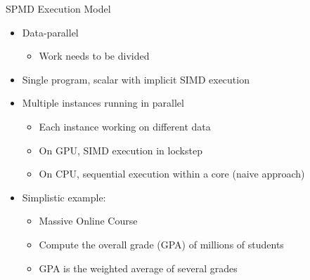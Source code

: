 
\begin{frame}{SPMD Execution Model}

\begin{itemize}
    \item Data-parallel
    \begin{itemize}
        \item Work needs to be divided
    \end{itemize}
    
    \item Single program, scalar with implicit SIMD execution
    
    \item Multiple instances running in parallel
    \begin{itemize}
        \item Each instance working on different data
        \item On GPU, SIMD execution in lockstep
        \item On CPU, sequential execution within a core (naive approach)
    \end{itemize}
\end{itemize}

\begin{itemize}
    \item Simplistic example:
    \begin{itemize}
        \item Massive Online Course
        \item Compute the overall grade (GPA) of millions of students
        \item GPA is the weighted average of several grades
    \end{itemize}
\end{itemize}

\end{frame}



